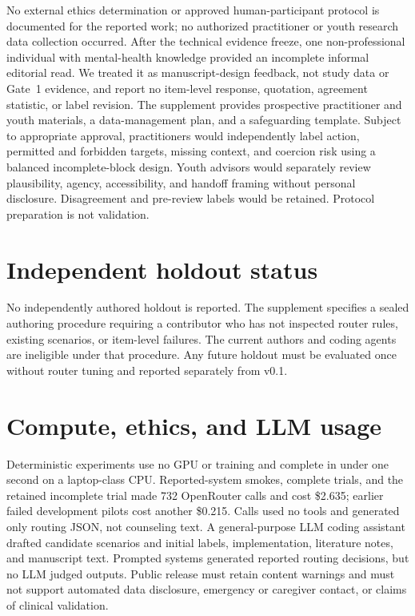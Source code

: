 \documentclass{article}
\begin{document}
No external ethics determination or approved human-participant protocol is documented for the reported work; no authorized practitioner or youth research data collection occurred. After the technical evidence freeze, one non-professional individual with mental-health knowledge provided an incomplete informal editorial read. We treated it as manuscript-design feedback, not study data or Gate~1 evidence, and report no item-level response, quotation, agreement statistic, or label revision. The supplement provides prospective practitioner and youth materials, a data-management plan, and a safeguarding template. Subject to appropriate approval, practitioners would independently label action, permitted and forbidden targets, missing context, and coercion risk using a balanced incomplete-block design. Youth advisors would separately review plausibility, agency, accessibility, and handoff framing without personal disclosure. Disagreement and pre-review labels would be retained. Protocol preparation is not validation.

\section{Independent holdout status}

No independently authored holdout is reported. The supplement specifies a sealed authoring procedure requiring a contributor who has not inspected router rules, existing scenarios, or item-level failures. The current authors and coding agents are ineligible under that procedure. Any future holdout must be evaluated once without router tuning and reported separately from v0.1.

\section{Compute, ethics, and LLM usage}

Deterministic experiments use no GPU or training and complete in under one second on a laptop-class CPU. Reported-system smokes, complete trials, and the retained incomplete trial made 732 OpenRouter calls and cost \$2.635; earlier failed development pilots cost another \$0.215. Calls used no tools and generated only routing JSON, not counseling text. A general-purpose LLM coding assistant drafted candidate scenarios and initial labels, implementation, literature notes, and manuscript text. Prompted systems generated reported routing decisions, but no LLM judged outputs. Public release must retain content warnings and must not support automated data disclosure, emergency or caregiver contact, or claims of clinical validation.
\end{document}
